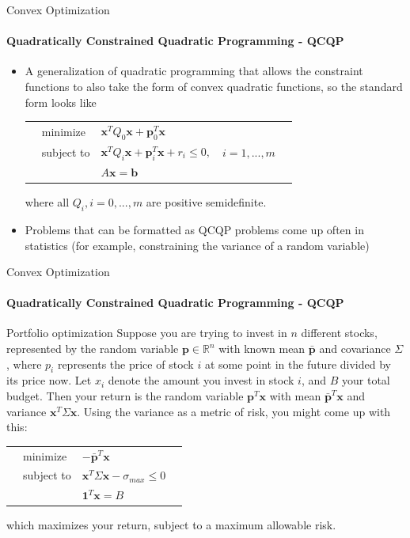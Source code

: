 \documentclass{beamer}
\renewcommand{\vec}{\mathbf}
\begin{document}
	\begin{frame}{Convex Optimization}
		\framesubtitle{Quadratically Constrained Quadratic Programming - QCQP}
		\begin{itemize}
			\item A generalization of quadratic programming that allows the constraint functions to also take the form of convex quadratic functions, so the standard form looks like
			\begin{tabularx}{\textwidth}{X l l l X}
				& minimize		& $\vec{x}^TQ_0\vec{x} + \vec{p}_0^T\vec{x}$	& &\\
				& subject to	& $\vec{x}^TQ_i\vec{x} + \vec{p}_i^T\vec{x} + r_i \leq 0,$	& $i=1,...,m$ &\\
				&				& $A\vec{x} = \vec{b}$ & &
			\end{tabularx}
			where all $Q_i, i=0,...,m$ are positive semidefinite.
			\item Problems that can be formatted as QCQP problems come up often in statistics (for example, constraining the variance of a random variable)
		\end{itemize}
	\end{frame}

	\begin{frame}{Convex Optimization}
		\framesubtitle{Quadratically Constrained Quadratic Programming - QCQP}
		\begin{block}{Portfolio optimization}
			Suppose you are trying to invest in $n$ different stocks, represented by the random variable $\vec{p}\in\mathbb{R}^n$ with known mean $\bar{\vec{p}}$ and covariance $\Sigma$, where $p_i$ represents the price of stock $i$ at some point in the future divided by its price now. Let $x_i$ denote the amount you invest in stock $i$, and $B$ your total budget. Then your return is the random variable $\vec{p}^T\vec{x}$ with mean $\bar{\vec{p}}^T\vec{x}$ and variance $\vec{x}^T\Sigma\vec{x}$. Using the variance as a metric of risk, you might come up with this:
			\begin{tabularx}{\textwidth}{X l l X}
				& minimize		& $-\bar{\vec{p}}^T\vec{x}$	& \\
				& subject to	& $\vec{x}^T\Sigma\vec{x} -\sigma_{max} \leq 0$	& \\
				&				& $\vec{1}^T\vec{x} = B$ & 
			\end{tabularx}
			which maximizes your return, subject to a maximum allowable risk.
		\end{block}
	\end{frame}
\end{document}
